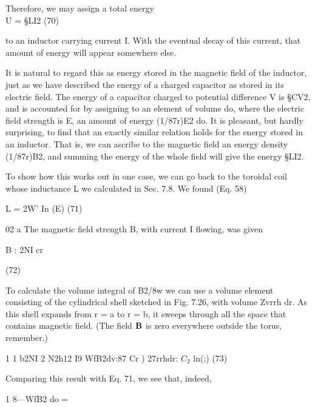 Therefore, we may assign a total energy
\begin{equation}
\end{equation}
U = §LI2 (70)

to an inductor carrying current I. With the eventual decay of this
current, that amount of energy will appear somewhere else.

It is natural to regard this as energy stored in the magnetic field
of the inductor, just as we have described the energy of a charged
capacitor as stored in its electric field. The energy of a capacitor
charged to potential difference V is §CV2, and is accounted for by
assigning to an element of volume do, where the electric field strength
is E, an amount of energy (1/87r)E2 do. It is pleasant, but hardly
surprising, to find that an exactly similar relation holds for the energy
stored in an inductor. That is, we can ascribe to the magnetic field
an energy density (1/87r)B2, and summing the energy of the whole
field will give the energy §LI2.

To show how this works out in one case, we can go back to the
toroidal coil whose inductance L we calculated in Sec. 7.8. We
found (Eq. 58)

\begin{equation}
\end{equation}
L = 2W' In (E) (71)

02 a
The magnetic field strength B, with current I flowing, was given

\begin{equation}
\end{equation}
B : 2NI
cr

(72)

To calculate the volume integral of B2/8w we can use a volume element
consisting of the cylindrical shell sketched in Fig. 7.26, with
volume Zvrrh dr. As this shell expands from r = a to r = b, it sweeps
through all the space that contains magnetic field. (The field $\mathbf{B}$ is
zero everywhere outside the torus, remember.)

\begin{equation}
\end{equation}
1 1 b2NI 2 N2h12 I9
WfB2dv:87  Cr ) 27rrhdr: $C_2$ ln(;) (73)

Comparing this result with Eq. 71, we see that, indeed,

\begin{equation}
\end{equation}
1
8---WfB2 do = %

